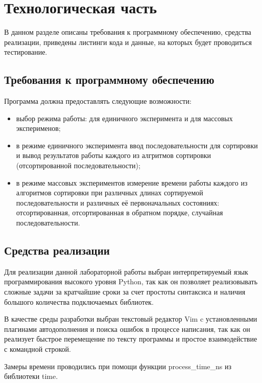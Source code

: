 \chapter{Технологическая часть}

В данном разделе описаны требования к программному обеспечению, средства
реализации, приведены листинги кода и данные, на которых будет проводиться
тестирование.

\section{Требования к программному обеспечению}

Программа должна предоставлять следующие возможности:
\begin{itemize}[left=\parindent]
    \item выбор режима работы: для единичного эксперимента и для массовых
          эксперименов;
    \item в режиме единичного эксперимента ввод последовательности для
          сортировки и вывод результатов работы каждого из алгритмов сортировки
          (отсортированной последовательности);
    \item в режиме массовых экспериментов измерение времени работы каждого из
          алгоритмов сортировки при различных длинах сортируемой
          последовательности и различных её первоначальных состояниях:
          отсортированная, отсортированная в обратном порядке, случайная
          последовательности.
\end{itemize}

\section{Средства реализации}

Для реализации данной лабораторной работы выбран интерпретируемый язык
программирования высокого уровня Python\cite{python}, так как он позволяет
реализовывать сложные задачи за кратчайшие сроки за счет простоты синтаксиса и
наличия большого количества подключаемых библиотек. 

В качестве среды разработки выбран текстовый редактор Vim\cite{vim} c
установленными плагинами автодополнения и поиска ошибок в процессе написания,
так как он реализует быстрое перемещение по тексту программы и простое
взаимодействие с командной строкой.

Замеры времени проводились при помощи функции process\_time\_ns из библиотеки
time\cite{time}.

